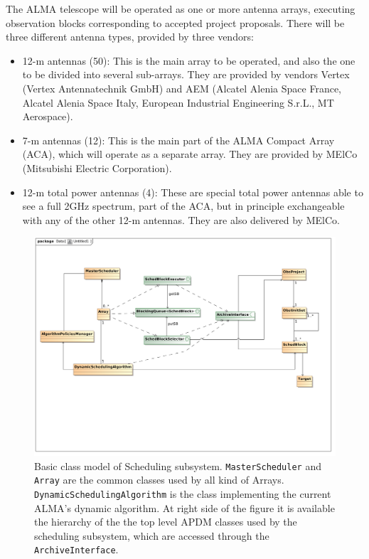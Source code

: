 The ALMA telescope will be operated as one or more antenna arrays, executing observation blocks corresponding to accepted project proposals. There will be three different antenna types, provided by three vendors:
\begin{itemize}
\item 12-m antennas (50): This is the main array to be operated, and also the one to be divided into several sub-arrays. They are provided by vendors Vertex (Vertex Antennatechnik GmbH) and AEM (Alcatel Alenia Space France, Alcatel Alenia Space Italy, European Industrial Engineering S.r.L., MT Aerospace).

\item 7-m antennas (12): This is the main part of the ALMA Compact Array (ACA), which will  operate as a separate array. They are provided by MElCo (Mitsubishi Electric Corporation).

\item 12-m total power antennas (4): These are special total power antennas able to see a full 2GHz spectrum, part of the ACA, but in principle exchangeable with any of the other 12-m antennas. They are also delivered by MElCo.

\end{itemize}

\begin{figure}	
\begin{center}
\includegraphics[width=\textwidth]{images/scheduling_class_model}
\end{center}
\caption[Basic class model of Scheduling subsystem] {Basic class model of Scheduling subsystem.
 \texttt{MasterScheduler} and \texttt{Array} are the common classes used by all kind of Arrays. \texttt{DynamicSchedulingAlgorithm} is the class implementing the current ALMA's dynamic algorithm. At right side of the figure it is available the hierarchy of the the top level APDM classes used by the scheduling subsystem, which are accessed through the \texttt{ArchiveInterface}. }
\label{fig:sched-class-model}
\end{figure}

